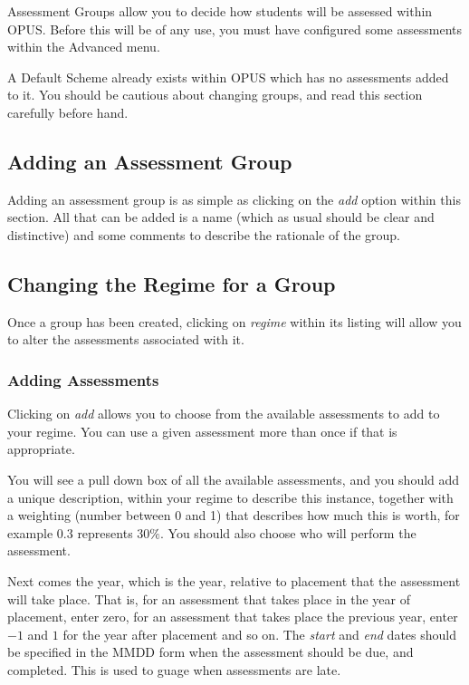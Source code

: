 \documentclass[12 pt]{book}
\begin{document}
Assessment Groups allow you to decide how students will be assessed within
OPUS. Before this will be of any use, you must have configured some assessments
within the Advanced menu.

A Default Scheme already exists within OPUS which has no assessments added to
it. You should be cautious about changing groups, and read this section
carefully before hand.

\subsection{Adding an Assessment Group}

Adding an assessment group is as simple as clicking on the \emph{add} option
within this section. All that can be added is a name (which as usual should be
clear and distinctive) and some comments to describe the rationale of the
group.

\subsection{Changing the Regime for a Group}

Once a group has been created, clicking on \emph{regime} within its listing
will allow you to alter the assessments associated with it.


\subsubsection{Adding Assessments}

Clicking on \emph{add} allows you to choose from the available assessments to
add to your regime. You can use a given assessment more than once if that is
appropriate.

You will see a pull down box of all the available assessments, and you should
add a unique description, within your regime to describe this instance,
together with a weighting (number between 0 and 1) that describes how much this
is worth, for example 0.3 represents $30\%$. You should also choose who will
perform the assessment.

Next comes the year, which is the year, relative to placement that the
assessment will take place. That is, for an assessment that takes place in the
year of placement, enter zero, for an assessment that takes place the previous
year, enter $-1$ and $1$ for the year after placement and so on. The
\emph{start} and \emph{end} dates should be specified in the MMDD form when
the assessment should be due, and completed. This is used to guage when 
assessments are late.
\end{document}
